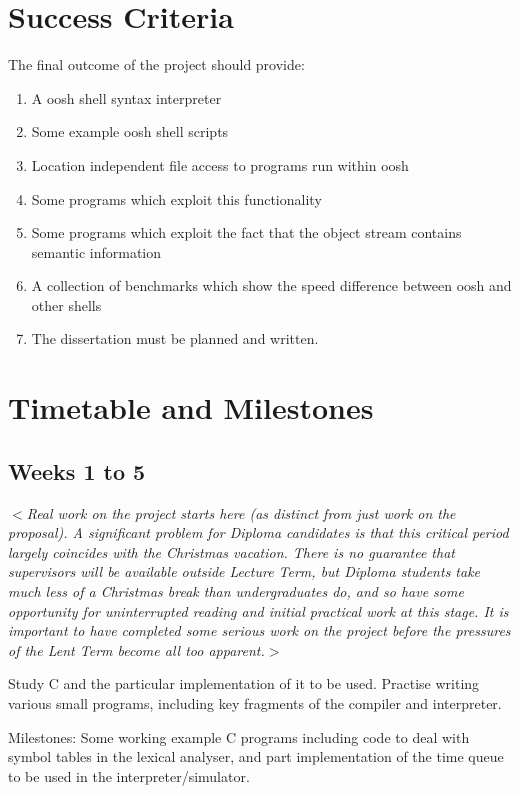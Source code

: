 \documentclass[12pt]{article}
\newcommand{\al}{$<$}
\newcommand{\ar}{$>$}
\begin{document}
\section*{Success Criteria}
The final outcome of the project should provide:

\begin{enumerate}
\item A oosh shell syntax interpreter
\item Some example oosh shell scripts
\item Location independent file access to programs run within oosh
\item Some programs which exploit this functionality
\item Some programs which exploit the fact that the object stream
  contains semantic information
\item A collection of benchmarks which show the speed difference
  between oosh and other shells
\item The dissertation must be planned and written.
\end{enumerate}

\section*{Timetable and Milestones}


\subsection*{Weeks 1 to 5}

\al\emph{Real work on the project starts here (as distinct from just
  work on the proposal).  A significant problem for Diploma candidates
  is that this critical period largely coincides with the Christmas
  vacation.  There is no guarantee that supervisors will be available
  outside Lecture Term, but Diploma students take much less of a
  Christmas break than undergraduates do, and so have some opportunity
  for uninterrupted reading and initial practical work at this stage.
  It is important to have completed some serious work on the project
  before the pressures of the Lent Term become all too apparent.}\ar

Study C and the particular implementation of it to be used.  Practise
writing various small programs, including key fragments of the compiler
and interpreter.

Milestones: Some working example C programs including code to deal
with symbol tables in the lexical analyser, and part implementation of
the time queue to be used in the interpreter/simulator.
\end{document}
